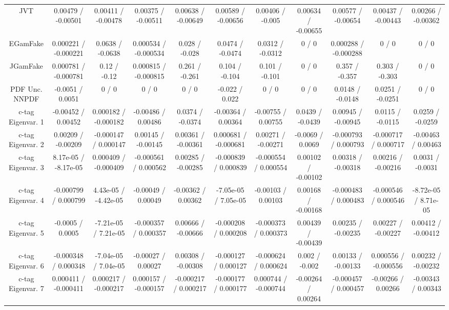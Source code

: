 \begin{table}[htbp]
\begin{center}
\begin{tabular}{|c|c|c|c|c|c|c|c|c|c|c|}
  JVT & 0.00479 / -0.00501 & 0.00411 / -0.00478 & 0.00375 / -0.00511 & 0.00638 / -0.00649 & 0.00589 / -0.00656 & 0.00406 / -0.005 & 0.00634 / -0.00655 & 0.00577 / -0.00654 & 0.00437 / -0.00443 & 0.00266 / -0.00362 \\ 
  EGamFake & 0.000221 / -0.000221 & 0.0638 / -0.0638 & 0.000534 / -0.000534 & 0.028 / -0.028 & 0.0474 / -0.0474 & 0.0312 / -0.0312 & 0 / 0 & 0.000288 / -0.000288 & 0 / 0 & 0 / 0 \\ 
  JGamFake & 0.000781 / -0.000781 & 0.12 / -0.12 & 0.000815 / -0.000815 & 0.261 / -0.261 & 0.104 / -0.104 & 0.101 / -0.101 & 0 / 0 & 0.357 / -0.357 & 0.303 / -0.303 & 0 / 0 \\ 
  PDF Unc. NNPDF & -0.0051 / 0.0051 & 0 / 0 & 0 / 0 & 0 / 0 & -0.022 / 0.022 & 0 / 0 & 0 / 0 & 0.0148 / -0.0148 & 0.0251 / -0.0251 & 0 / 0 \\ 
  c-tag Eigenvar. 1 & -0.00452 / 0.00452 & 0.000182 / -0.000182 & -0.00486 / 0.00486 & 0.0374 / -0.0374 & -0.00364 / 0.00364 & -0.00755 / 0.00755 & 0.0439 / -0.0439 & 0.00945 / -0.00945 & 0.0115 / -0.0115 & 0.0259 / -0.0259 \\ 
  c-tag Eigenvar. 2 & 0.00209 / -0.00209 & -0.000147 / 0.000147 & 0.00145 / -0.00145 & 0.00361 / -0.00361 & 0.000681 / -0.000681 & 0.00271 / -0.00271 & -0.0069 / 0.0069 & -0.000793 / 0.000793 & -0.000717 / 0.000717 & -0.00463 / 0.00463 \\ 
  c-tag Eigenvar. 3 & 8.17e-05 / -8.17e-05 & 0.000409 / -0.000409 & -0.000561 / 0.000562 & 0.00285 / -0.00285 & -0.000839 / 0.000839 & -0.000554 / 0.000554 & 0.00102 / -0.00102 & 0.00318 / -0.00318 & 0.00216 / -0.00216 & 0.0031 / -0.0031 \\ 
  c-tag Eigenvar. 4 & -0.000799 / 0.000799 & 4.43e-05 / -4.42e-05 & -0.00049 / 0.00049 & -0.00362 / 0.00362 & -7.05e-05 / 7.05e-05 & -0.00103 / 0.00103 & 0.00168 / -0.00168 & -0.000483 / 0.000483 & -0.000546 / 0.000546 & -8.72e-05 / 8.71e-05 \\ 
  c-tag Eigenvar. 5 & -0.0005 / 0.0005 & -7.21e-05 / 7.21e-05 & -0.000357 / 0.000357 & 0.00666 / -0.00666 & -0.000208 / 0.000208 & -0.000373 / 0.000373 & 0.00439 / -0.00439 & 0.00235 / -0.00235 & 0.00227 / -0.00227 & 0.00412 / -0.00412 \\ 
  c-tag Eigenvar. 6 & -0.000348 / 0.000348 & -7.04e-05 / 7.04e-05 & -0.00027 / 0.00027 & 0.00308 / -0.00308 & -0.000127 / 0.000127 & -0.000624 / 0.000624 & 0.002 / -0.002 & 0.00133 / -0.00133 & 0.000556 / -0.000556 & 0.00232 / -0.00232 \\ 
  c-tag Eigenvar. 7 & 0.000411 / -0.000411 & 0.000217 / -0.000217 & 0.000157 / -0.000157 & -0.000217 / 0.000217 & -0.000177 / 0.000177 & 0.000744 / -0.000744 & -0.00264 / 0.00264 & -0.000457 / 0.000457 & -0.00266 / 0.00266 & -0.00343 / 0.00343 \\ 

\end{tabular}
\end{center}
\end{table}
